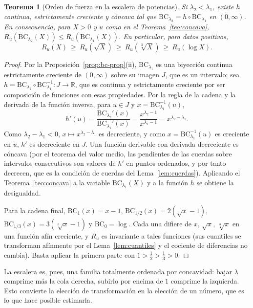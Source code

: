 \documentclass[11pt]{article}
\newtheorem{teorema}{Teorema}[section]
\theoremstyle{definition}
\theoremstyle{remark}
\newcommand{\R}{\mathbb{R}}
\newcommand{\BC}{\mathrm{BC}}
\begin{document}
\begin{teorema}[Orden de fuerza en la escalera de potencias]\label{teo:escalera}
\noindent Si $\lambda_2<\lambda_1$, existe $h$ continua, estrictamente creciente y cóncava tal que $\BC_{\lambda_2}=h\circ\BC_{\lambda_1}$ en $(0,\infty)$. En consecuencia, para $X>0$ y $u$ como en el Teorema~\ref{teo:concava}, $R_u(\BC_{\lambda_2}(X))\le R_u(\BC_{\lambda_1}(X))$. En particular, para datos positivos,
\[
R_u(X)\ \ge\ R_u(\sqrt X)\ \ge\ R_u(\sqrt[3]{X})\ \ge\ R_u(\log X).
\]
\end{teorema}
\begin{proof}
\noindent Por la Proposición~\ref{prop:bc-prop}(ii), $\BC_{\lambda_1}$ es una biyección continua estrictamente creciente de $(0,\infty)$ sobre su imagen $J$, que es un intervalo; sea $h=\BC_{\lambda_2}\circ\BC_{\lambda_1}^{-1}:J\to\R$, que es continua y estrictamente creciente por ser composición de funciones con esas propiedades. Por la regla de la cadena y la derivada de la función inversa, para $u\in J$ y $x=\BC_{\lambda_1}^{-1}(u)$,
\[
h'(u)=\frac{\BC_{\lambda_2}'(x)}{\BC_{\lambda_1}'(x)}=\frac{x^{\lambda_2-1}}{x^{\lambda_1-1}}=x^{\lambda_2-\lambda_1}.
\]
Como $\lambda_2-\lambda_1<0$, $x\mapsto x^{\lambda_2-\lambda_1}$ es decreciente, y como $x=\BC_{\lambda_1}^{-1}(u)$ es creciente en $u$, $h'$ es decreciente en $J$. Una función derivable con derivada decreciente es cóncava (por el teorema del valor medio, las pendientes de las cuerdas sobre intervalos consecutivos son valores de $h'$ en puntos ordenados, y por tanto decrecen, que es la condición de cuerdas del Lema~\ref{lem:cuerdas}). Aplicando el Teorema~\ref{teo:concava} a la variable $\BC_{\lambda_1}(X)$ y a la función $h$ se obtiene la desigualdad.

\medskip

\noindent Para la cadena final, $\BC_1(x)=x-1$, $\BC_{1/2}(x)=2(\sqrt x-1)$, $\BC_{1/3}(x)=3(\sqrt[3]x-1)$ y $\BC_0=\log$. Cada una difiere de $x$, $\sqrt x$, $\sqrt[3]x$ en una función afín creciente, y $R_u$ es invariante a tales funciones (sus cuantiles se transforman afínmente por el Lema~\ref{lem:cuantiles} y el cociente de diferencias no cambia). Basta aplicar la primera parte con $1>\frac12>\frac13>0$.
\end{proof}

\noindent La escalera es, pues, una familia totalmente ordenada por concavidad: bajar $\lambda$ comprime más la cola derecha, subirlo por encima de $1$ comprime la izquierda. Esto convierte la elección de transformación en la elección de un número, que es lo que hace posible estimarla.
\end{document}
